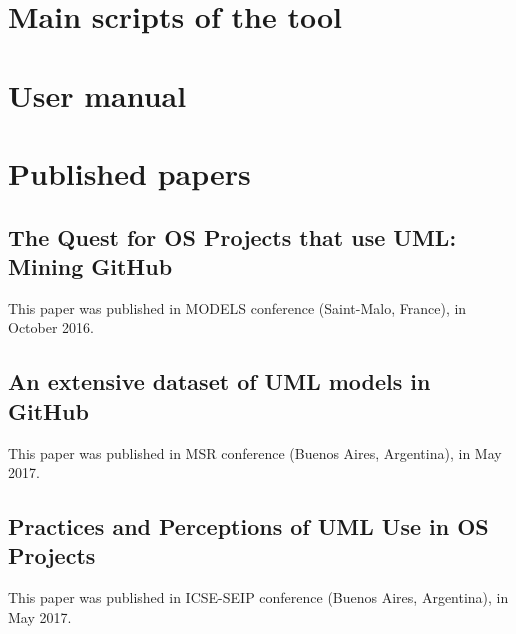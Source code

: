 \documentclass[a4paper, 12pt]{book}
\begin{document}
\chapter{Main scripts of the tool}
\label{app:scripts}
\chapter{User manual}
\label{app:manual}
\chapter{Published papers}
\label{app:papers}
\section{The Quest for OS Projects that use UML: Mining GitHub}
\label{sec:paper-models}
This paper was published in MODELS conference (Saint-Malo, France), in October 2016.

\section{An extensive dataset of UML models in GitHub}
\label{sec:paper-msr}
This paper was published in MSR conference (Buenos Aires, Argentina), in May 2017.

\section{Practices and Perceptions of UML Use in OS Projects}
\label{sec:paper-msr}
This paper was published in ICSE-SEIP conference (Buenos Aires, Argentina), in May 2017.

\cleardoublepage

\end{document}
